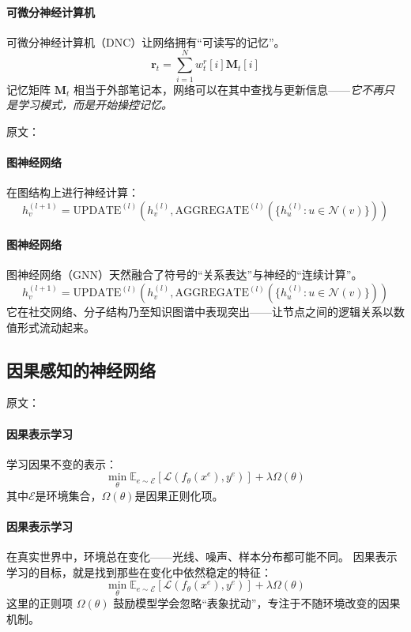 \paragraph{可微分神经计算机}
可微分神经计算机（DNC）让网络拥有“可读写的记忆”。  
$$\mathbf{r}_t = \sum_{i=1}^{N} w_t^r[i] \mathbf{M}_t[i]$$
记忆矩阵 $\mathbf{M}_t$ 相当于外部笔记本，网络可以在其中查找与更新信息——\emph{它不再只是学习模式，而是开始操控记忆。}

原文：
\paragraph{图神经网络}
在图结构上进行神经计算：
$$h_v^{(l+1)} = \text{UPDATE}^{(l)}\left(h_v^{(l)}, \text{AGGREGATE}^{(l)}\left(\{h_u^{(l)} : u \in \mathcal{N}(v)\}\right)\right)$$
\paragraph{图神经网络}
图神经网络（GNN）天然融合了符号的“关系表达”与神经的“连续计算”。  
$$h_v^{(l+1)} = \text{UPDATE}^{(l)}\left(h_v^{(l)}, \text{AGGREGATE}^{(l)}\left(\{h_u^{(l)} : u \in \mathcal{N}(v)\}\right)\right)$$
它在社交网络、分子结构乃至知识图谱中表现突出——让节点之间的逻辑关系以数值形式流动起来。

\subsection{因果感知的神经网络}

原文：
\paragraph{因果表示学习}
学习因果不变的表示：
$$\min_{\theta} \mathbb{E}_{e \sim \mathcal{E}} \left[ \mathcal{L}(f_\theta(x^e), y^e) \right] + \lambda \Omega(\theta)$$
其中$\mathcal{E}$是环境集合，$\Omega(\theta)$是因果正则化项。
\paragraph{因果表示学习}
在真实世界中，环境总在变化——光线、噪声、样本分布都可能不同。  
因果表示学习的目标，就是找到那些在变化中依然稳定的特征：  
$$\min_{\theta} \mathbb{E}_{e \sim \mathcal{E}} \left[ \mathcal{L}(f_\theta(x^e), y^e) \right] + \lambda \Omega(\theta)$$
这里的正则项 $\Omega(\theta)$ 鼓励模型学会忽略“表象扰动”，专注于不随环境改变的因果机制。

